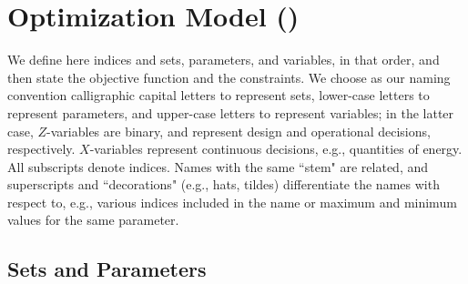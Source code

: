 \begin{comment}
	\multicolumn{1}{|l|}{}              & \multicolumn{1}{l|}{1X: excess generation}                   & 3 = 1X      \\ \cline{2-3} 
	\multicolumn{1}{|l|}{}              & \multicolumn{1}{l|}{1S: electricity in battery storage}      & 4 = 1S      \\ \hline
	&                                                                         &             \\ \hline
	\multicolumn{1}{|l|}{$\mathcal{V}$} & \multicolumn{1}{l|}{Below net metering limit regime} & 1 = BelowNM \\ \cline{2-3} 
	\multicolumn{1}{|l|}{(Net Metering)} & \multicolumn{1}{l|}{Net metering to interconnect limit regime} & 2 = NMtoIL  \\ \cline{2-3} 
	\multicolumn{1}{|l|}{}  & \multicolumn{1}{l|}{Above interconnect limit regime}  & 3 = AboveIL \\ \hline
\end{longtable}
\end{comment}
\section{Optimization Model (\reoptlitemod)}
\label{sec:Optimization_Model}
We define here indices and sets, parameters, and variables, in that order, and then state the objective function and the constraints.
We choose as our naming convention calligraphic capital letters to represent sets, lower-case letters to represent parameters, and upper-case letters to represent variables; in the latter case, $Z$-variables are binary, and represent design and operational decisions, respectively. $X$-variables represent continuous decisions, e.g., quantities of energy.
All subscripts denote indices. Names with the same ``stem" are related, and superscripts and ``decorations" (e.g., hats, tildes) differentiate the names with respect to, e.g., various indices included in the name or 
maximum and minimum values for the same parameter.
\newpage
\subsection{Sets and Parameters}

